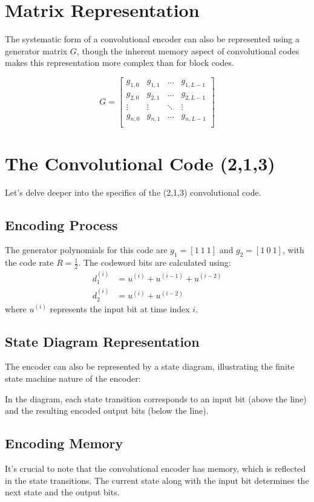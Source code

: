 \section*{Matrix Representation}
The systematic form of a convolutional encoder can also be represented using a generator matrix \(G\), though the inherent memory aspect of convolutional codes makes this representation more complex than for block codes.

\[
G = 
\begin{bmatrix}
    g_{1,0} & g_{1,1} & \dots & g_{1,L-1} \\
    g_{2,0} & g_{2,1} & \dots & g_{2,L-1} \\
    \vdots  & \vdots  & \ddots & \vdots    \\
    g_{n,0} & g_{n,1} & \dots & g_{n,L-1} \\
\end{bmatrix}
\]


\section*{The Convolutional Code (2,1,3)}

Let's delve deeper into the specifics of the (2,1,3) convolutional code.

\subsection*{Encoding Process}
The generator polynomials for this code are $g_1 = [1\ 1\ 1]$ and $g_2 = [1\ 0\ 1]$, with the code rate $R = \frac{1}{2}$. The codeword bits are calculated using:
\begin{align*}
    d_1^{(i)} &= u^{(i)} + u^{(i-1)} + u^{(i-2)} \\
    d_2^{(i)} &= u^{(i)} + u^{(i-2)}
\end{align*}
where $u^{(i)}$ represents the input bit at time index $i$.

\subsection*{State Diagram Representation}
The encoder can also be represented by a state diagram, illustrating the finite state machine nature of the encoder:

In the diagram, each state transition corresponds to an input bit (above the line) and the resulting encoded output bits (below the line).

\subsection*{Encoding Memory}
It's crucial to note that the convolutional encoder has memory, which is reflected in the state transitions. The current state along with the input bit determines the next state and the output bits.









